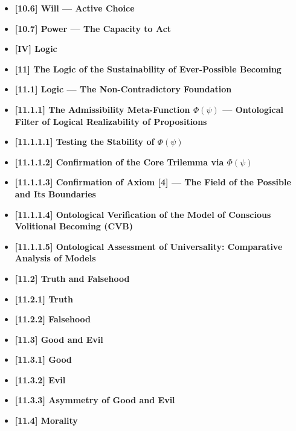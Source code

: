 \documentclass[12pt]{article}
\begin{document}
\begin{itemize}
\item \textbf{[10.6] Will — Active Choice}

\item \textbf{[10.7] Power — The Capacity to Act}

\item \textbf{[IV] Logic}

\item \textbf{[11] The Logic of the Sustainability of Ever-Possible Becoming}

\item \textbf{[11.1] Logic — The Non-Contradictory Foundation}

\item \textbf{[11.1.1] The Admissibility Meta-Function $\Phi(\psi)$ — Ontological Filter of Logical Realizability of Propositions}

\item \textbf{[11.1.1.1] Testing the Stability of $\Phi(\psi)$}

\item \textbf{[11.1.1.2] Confirmation of the Core Trilemma via $\Phi(\psi)$}

\item \textbf{[11.1.1.3] Confirmation of Axiom [4] — The Field of the Possible and Its Boundaries}

\item \textbf{[11.1.1.4] Ontological Verification of the Model of Conscious Volitional Becoming (CVB)}

\item \textbf{[11.1.1.5] Ontological Assessment of Universality: Comparative Analysis of Models}

\item \textbf{[11.2] Truth and Falsehood}

\item \textbf{[11.2.1] Truth}

\item \textbf{[11.2.2] Falsehood}

\item \textbf{[11.3] Good and Evil}

\item \textbf{[11.3.1] Good}

\item \textbf{[11.3.2] Evil}

\item \textbf{[11.3.3] Asymmetry of Good and Evil}

\item \textbf{[11.4] Morality}


\end{itemize}
\end{document}
